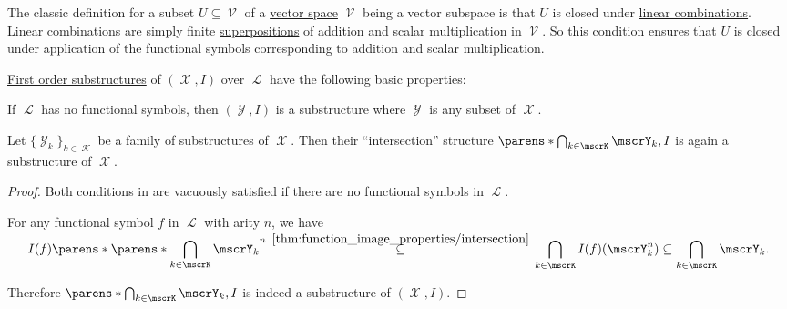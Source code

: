 \begin{example}\label{ex:def:first_order_substructure/vector_space}
  The classic definition for a subset \( U \subseteq \mscrV \) of a \hyperref[def:vector_space]{vector space} \( \mscrV \) being a vector subspace is that \( U \) is closed under \hyperref[def:linear_combination]{linear combinations}. Linear combinations are simply finite \hyperref[def:function/superposition]{superpositions} of addition and scalar multiplication in \( \mscrV \). So this condition ensures that \( U \) is closed under application of the functional symbols corresponding to addition and scalar multiplication.
\end{example}

\begin{proposition}\label{thm:first_order_substructure_properties}
  \hyperref[def:first_order_substructure]{First order substructures} of \( (\mscrX, I) \) over \( \mscrL \) have the following basic properties:
  \begin{thmenum}
     If \( \mscrL \) has no functional symbols, then \( (\mscrY, I) \) is a substructure where \( \mscrY \) is any subset of \( \mscrX \).

     Let \( \{ \mscrY_k \}_{k \in \mscrK} \) be a family of substructures of \( \mscrX \). Then their \enquote{intersection} structure \( \parens*{\bigcap_{k \in \mscrK} \mscrY_k, I} \) is again a substructure of \( \mscrX \).
  \end{thmenum}
\end{proposition}
\begin{proof}
   Both conditions in  are vacuously satisfied if there are no functional symbols in \( \mscrL \).

   For any functional symbol \( f \) in \( \mscrL \) with arity \( n \), we have
  \begin{equation*}
    I(f)\parens*{\parens*{\bigcap_{\smash{k \in \mscrK}} \mscrY_k}^n}
    \reloset {\ref{thm:function_image_properties/intersection}} \subseteq
    \bigcap_{k \in \mscrK} I(f)(\mscrY_k^n) \subseteq \bigcap_{k \in \mscrK} \mscrY_k.
  \end{equation*}

  Therefore \( \parens*{\bigcap_{k \in \mscrK} \mscrY_k, I} \) is indeed a substructure of \( (\mscrX, I) \).
\end{proof}

